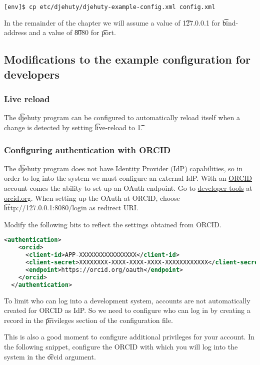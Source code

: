 \begin{lstlisting}[language=bash]
[env]$ cp etc/djehuty/djehuty-example-config.xml config.xml
\end{lstlisting}

In the remainder of the chapter we will assume a value of \t{127.0.0.1} for
\t{bind-address} and a value of \t{8080} for \t{port}.

\subsection{Modifications to the example configuration for developers}

\subsubsection{Live reload}

The \t{djehuty} program can be configured to automatically reload itself when
a change is detected by setting \t{live-reload} to \t{1}.

\subsubsection{Configuring authentication with ORCID}

The \t{djehuty} program does not have Identity Provider (IdP) capabilities,
so in order to log into the system we must configure an external IdP.  With
an \href{https://orcid.org}{ORCID} account comes the ability to set up an OAuth
endpoint.  Go to \href{https://orcid.org/developer-tools}{developer-tools} at
\href{https://orcid.org}{orcid.org}.  When setting up the OAuth at ORCID,
choose \t{http://127.0.0.1:8080/login} as redirect URI.

Modify the following bits to reflect the settings obtained from ORCID.
\begin{lstlisting}[language=xml]
  <authentication>
    <orcid>
      <client-id>APP-XXXXXXXXXXXXXXXX</client-id>
      <client-secret>XXXXXXXX-XXXX-XXXX-XXXX-XXXXXXXXXXXX</client-secret>
      <endpoint>https://orcid.org/oauth</endpoint>
    </orcid>
  </authentication>
\end{lstlisting}

To limit who can log into a development system, accounts are not automatically
created for ORCID as IdP.  So we need to configure who can log in by creating
a record in the \t{privileges} section of the configuration file.

This is also a good moment to configure additional privileges for your account.
In the following snippet, configure the ORCID with which you will log into
the system in the \t{orcid} argument.

